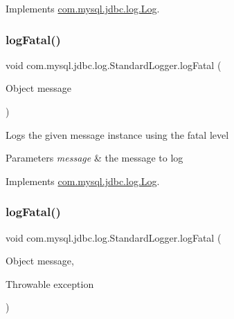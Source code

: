 Implements \mbox{\hyperlink{interfacecom_1_1mysql_1_1jdbc_1_1log_1_1_log_abca2e1258e8b1bca83fd13066e8930cd}{com.\+mysql.\+jdbc.\+log.\+Log}}.

\mbox{\label{classcom_1_1mysql_1_1jdbc_1_1log_1_1_standard_logger_a667dcddbec69b9f552a2c765b5396d36}} 
\subsubsection{\texorpdfstring{log\+Fatal()}{logFatal()}\hspace{0.1cm}{\footnotesize\ttfamily [1/2]}}
{\footnotesize\ttfamily void com.\+mysql.\+jdbc.\+log.\+Standard\+Logger.\+log\+Fatal (\begin{DoxyParamCaption}\item[{Object}]{message }\end{DoxyParamCaption})}

Logs the given message instance using the \textquotesingle{}fatal\textquotesingle{} level


\begin{DoxyParams}{Parameters}
{\em message} & the message to log \\
\hline
\end{DoxyParams}


Implements \mbox{\hyperlink{interfacecom_1_1mysql_1_1jdbc_1_1log_1_1_log_a8d3b6b295ded6eaa1bfa50ffca6a4d28}{com.\+mysql.\+jdbc.\+log.\+Log}}.

\mbox{\label{classcom_1_1mysql_1_1jdbc_1_1log_1_1_standard_logger_a4e5b84fe2f897f169521ae8b712c5626}} 
\subsubsection{\texorpdfstring{log\+Fatal()}{logFatal()}\hspace{0.1cm}{\footnotesize\ttfamily [2/2]}}
{\footnotesize\ttfamily void com.\+mysql.\+jdbc.\+log.\+Standard\+Logger.\+log\+Fatal (\begin{DoxyParamCaption}\item[{Object}]{message,  }\item[{Throwable}]{exception }\end{DoxyParamCaption})}

